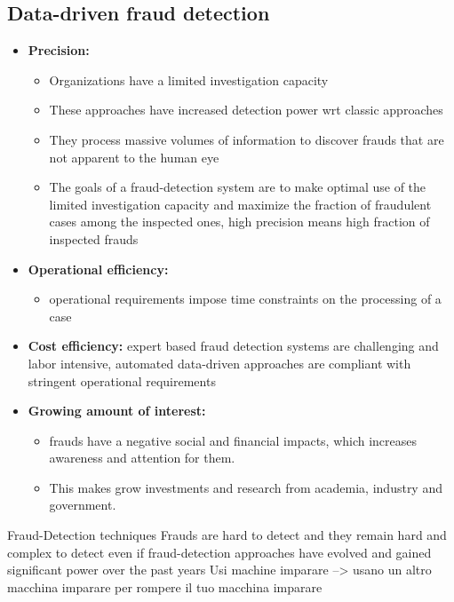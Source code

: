     \subsection{Data-driven fraud detection}
        \begin{itemize}
            \item \textbf{Precision:}
            \begin{itemize}
                \item Organizations have a limited investigation capacity
                \item These approaches have increased detection power wrt classic approaches
                \item They process massive volumes of information to discover frauds that are not apparent to the human eye
                \item The goals of a fraud-detection system are to make optimal use of the limited investigation capacity and maximize the fraction of fraudulent cases among the inspected ones, high precision means high fraction of inspected frauds
            \end{itemize}
            \item \textbf{Operational efficiency:}
            \begin{itemize}
                \item operational requirements impose time constraints on the processing of a case
            \end{itemize} 
            \item \textbf{Cost efficiency:} expert based fraud detection systems are challenging and labor intensive, automated data-driven approaches are compliant with stringent operational requirements
            \item \textbf{Growing amount of interest:} 
            \begin{itemize}
                \item frauds have a negative social and financial impacts, which increases awareness and attention for them.
                \item This makes grow investments and research from academia, industry and government.
            \end{itemize}
        \end{itemize}
\iffalse
Fraud-Detection techniques
    Frauds are hard to detect 
        and they remain hard and complex to detect even if fraud-detection approaches have evolved and gained significant power over the past years 
        Usi machine imparare --> usano un altro macchina imparare per rompere il tuo macchina imparare

